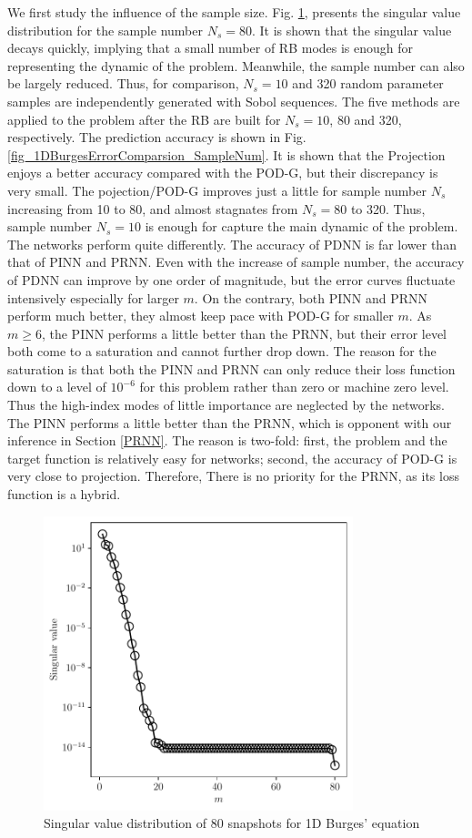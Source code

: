 \documentclass[preprint, 10pt]{elsarticle}
\begin{document}
We first study the influence of the sample size. Fig. \ref{fig_1DBurgesSingularValues_80}, presents the singular value distribution for the sample number $N_s=80$. It is shown that the singular value decays quickly, implying that  a small number of RB modes is enough for representing the dynamic of the problem. Meanwhile, the sample number can also be largely reduced. Thus, for comparison, $N_{s}=10$ and 320 random parameter samples are independently generated with Sobol sequences. The five methods are applied to the problem after the RB are built for $N_{s}=10$, 80 and 320, respectively. The prediction accuracy is shown in Fig. \ref{fig_1DBurgesErrorComparsion_SampleNum}. It is shown that the Projection enjoys a better accuracy compared with the POD-G, but their discrepancy is very small. The pojection/POD-G improves just a little for sample number $N_s$ increasing from 10 to 80, and almost stagnates from $N_s=80$ to 320. Thus, sample number $N_s=10$ is enough for capture the main dynamic of the problem. The networks perform quite differently. The accuracy of PDNN is far lower than that of PINN and PRNN. Even with the increase of sample number, the accuracy of PDNN can improve by one order of magnitude, but the error curves fluctuate intensively especially for larger $m$. On the contrary, both PINN and PRNN perform much better, they almost keep pace with POD-G for smaller $m$. As $m \ge 6$, the PINN performs a little better than the PRNN, but their error level both come to a saturation and cannot further drop down. The reason for the saturation is that both the PINN and PRNN can only reduce their loss function down to a level of $10^{-6}$ for this problem rather than zero or machine zero level. Thus the high-index modes of little importance are neglected by the networks.  The PINN performs a little better than the PRNN, which is opponent with our inference in Section \ref{PRNN}. The reason is two-fold: first, the problem and the target function is relatively easy for networks; second, the accuracy of POD-G is very close to projection. Therefore, There is no priority for the PRNN, as its loss function is a hybrid.

\begin{figure}[!ht]
  \centering
  \includegraphics[width=9cm]{../../pythonNN/1DBurges/fig/SingularValues_80.pdf}
\caption{Singular value distribution of 80 snapshots for 1D Burges' equation}
\label{fig_1DBurgesSingularValues_80}
\end{figure}
\end{document}
